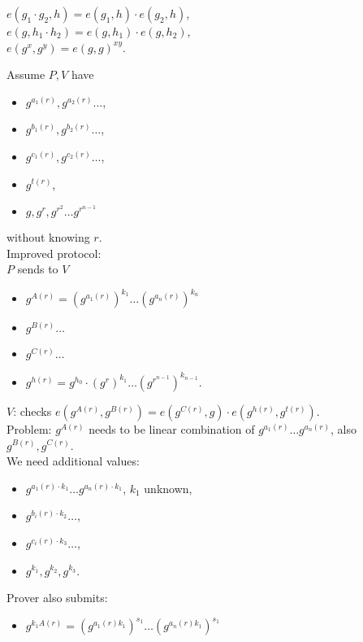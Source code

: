 \documentclass[a4paper, 12pt]{book}
\theoremstyle{definition}
\theoremstyle{remark}
\begin{document}
\begin{itemize}
\begin{itemize}
        $e(g_1 \cdot g_2, h) = e(g_1, h) \cdot e(g_2, h)$, \\
        $e(g, h_1 \cdot h_2) = e(g, h_1) \cdot e(g, h_2)$, \\
        $e\left(g^x, g^y\right) = e(g, g)^{xy}$.
    \end{itemize}
    Assume $P, V$ have
    \begin{itemize}
      \item $g^{a_1(r)}, g^{a_2(r)} \dots$,
      \item $g^{b_1(r)}, g^{b_2(r)} \dots$,
      \item $g^{c_1(r)}, g^{c_2(r)} \dots$,
      \item $g^{t(r)}$,
      \item $g, g^r, g^{r^2} \dots g^{r^{n-1}}$
    \end{itemize}
    without knowing $r$. \\
    Improved protocol: \\
    $P$ sends to $V$
    \begin{itemize}
      \item $g^{A(r)} = \left(g^{a_1(r)}\right)^{k_1} \dots \left(g^{a_n(r)}\right)^{k_n}$
      \item $g^{B(r)} \dots$
      \item $g^{C(r)} \dots$
      \item $g^{h(r)} = g^{h_0} \cdot \left(g^r\right)^{k_1} \dots \left(g^{r^{n-1}}\right)^{k_{n-1}}$.
    \end{itemize}
    $V$: checks $e\left(g^{A(r)}, g^{B(r)}\right) = e\left(g^{C(r)}, g\right) \cdot e\left(g^{h(r)}, g^{t(r)}\right)$. \\
    Problem: $g^{A(r)}$ needs to be linear combination of $g^{a_1(r)} \dots g^{a_n(r)}$, also $g^{B(r)}, g^{C(r)}$. \\
    We need additional values:
    \begin{itemize}
      \item $g^{a_1(r) \cdot k_1} \dots g^{a_n(r) \cdot k_1}$, $k_1$ unknown,
      \item $g^{b_i(r) \cdot k_2} \dots$,
      \item $g^{c_i(r) \cdot k_3} \dots$,
      \item $g^{k_1}, g^{k_2}, g^{k_3}$.
    \end{itemize}
    Prover also submits:
    \begin{itemize}
      \item $g^{k_1 A(r)} = \left(g^{a_1(r) k_1}\right)^{s_1} \dots \left(g^{a_n(r) k_1}\right)^{s_1}$

\end{itemize}
\end{itemize}
\end{document}
